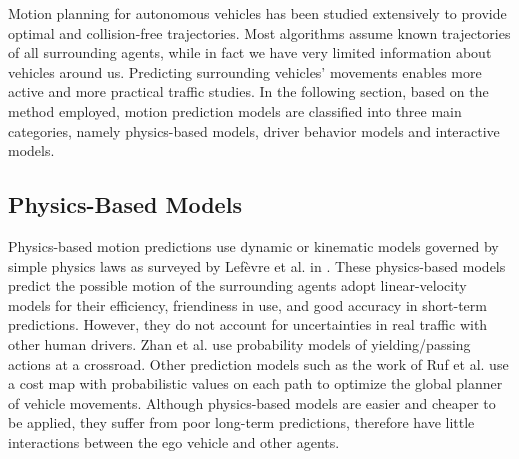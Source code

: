 


Motion planning for autonomous vehicles has been studied extensively to provide optimal and collision-free trajectories\cite{motion_planning}. Most algorithms assume known trajectories of all surrounding agents, while in fact we have very limited information about  vehicles around us. Predicting surrounding vehicles' movements enables more active and more practical traffic studies. In the following section, based on the method employed, motion prediction models are classified into three main categories, namely physics-based models, driver behavior models and interactive models.


\subsection{Physics-Based Models}
\label{Literature:Physics-Based}
Physics-based motion predictions use dynamic or kinematic models governed by simple physics laws as surveyed by Lef{\`e}vre et al. in \cite{survey_motion_prediction}.  These physics-based models predict the possible motion of the surrounding agents adopt  linear-velocity models for their efficiency, friendiness in use, and good accuracy in short-term predictions\cite{physics_real_time, physics_velocity_obstacle}. However, they do not account for uncertainties in real traffic with other human drivers. Zhan et al. use  probability models of yielding/passing actions at a crossroad\cite{non-conservative}. Other prediction models such as the work of Ruf et al. \cite{sparc} use a cost map with probabilistic values on each path to optimize the global planner of vehicle movements. Although physics-based models are easier and cheaper to be applied, they suffer from poor long-term predictions, therefore have little interactions between the ego vehicle and other agents.



